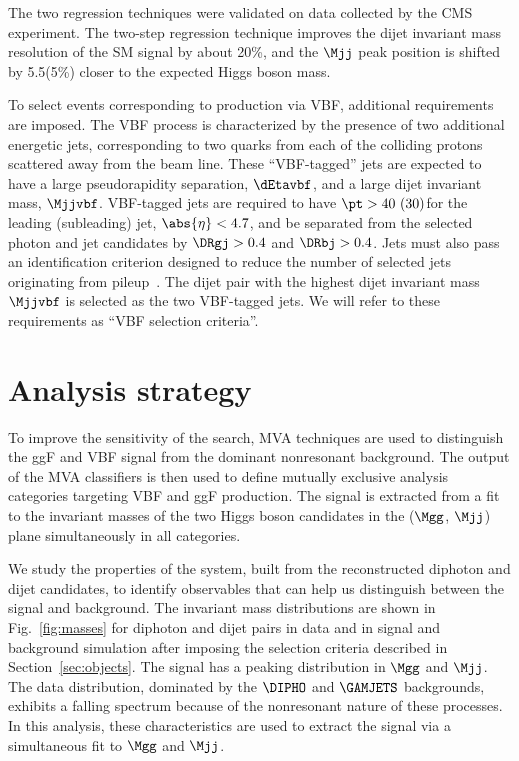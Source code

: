 \documentclass[11pt,a4paper,cmspaper,final,collab]{cms-tdr}
\begin{document}
The two regression techniques were validated on data collected by the CMS experiment.
The two-step regression technique improves the dijet invariant mass resolution of the SM \HH signal by about 20\%, and the $\Mjj$ peak position is shifted by 5.5\GeV (5\%) closer to the expected Higgs boson mass.


To select events corresponding to \HH production via VBF, additional requirements are imposed. The VBF
process is characterized by the presence of two additional energetic jets, corresponding to two quarks from each of the colliding protons scattered away from the beam line. These ``VBF-tagged'' jets are expected to have a large pseudorapidity separation, $\dEtavbf$, and a large dijet invariant mass, $\Mjjvbf$.  VBF-tagged jets are required to have $\pt > 40~(30)$\GeV for the leading (subleading) jet, $\abs{\eta} < 4.7$, and be separated from the selected photon and {\cPqb} jet candidates by $\DRgj > 0.4$ and $\DRbj > 0.4$. Jets must also pass an identification criterion designed to reduce the number of selected jets originating from pileup~\cite{PUJID}. The dijet pair with the highest dijet invariant mass $\Mjjvbf$ is selected as the two VBF-tagged jets. We will refer to these requirements as ``VBF selection criteria''.
 

\section{Analysis strategy}
\label{sec:hhsystem}
To improve the sensitivity of the search, MVA techniques are used to distinguish the ggF and VBF \HH signal from the dominant nonresonant background. The output of the MVA classifiers is then used to define mutually exclusive analysis categories targeting VBF and ggF \HH production. 
 The \HH signal is extracted from a fit to the 
invariant masses of the two Higgs boson candidates in the ($\Mgg$, $\Mjj$) plane simultaneously in all categories.
 
We study the properties of the \HH system, built from the reconstructed diphoton and dijet candidates, to identify observables that can help us distinguish between the signal and background. The invariant mass distributions are shown in Fig.~\ref{fig:masses} for diphoton and dijet pairs in data and in signal and background simulation after imposing the selection criteria described in Section~\ref{sec:objects}. 
The signal has a peaking distribution in $\Mgg$ and $\Mjj$. The data distribution, dominated by the $\DIPHO$ and $\GAMJETS$ backgrounds, exhibits a falling spectrum because of the nonresonant nature of these processes.
In this analysis, these characteristics are used to extract the signal via a simultaneous fit to $\Mgg$ and $\Mjj$.
\end{document}
